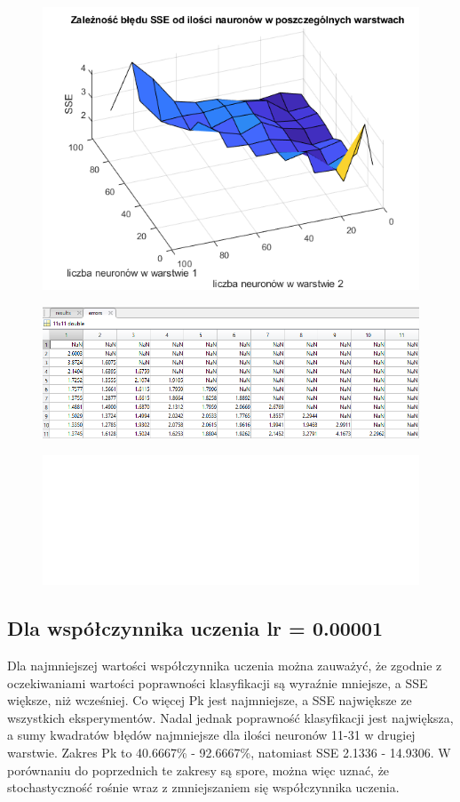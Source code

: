 \documentclass[a4paper, 12pt]{report}
\begin{document}
\begin{figure}[hbt!]
\includegraphics[width=14cm]{lr4 sse}
\centering
\end{figure}

\begin{figure}[hbt!]
\includegraphics[width=14cm]{lr4 sse dane}
\centering
\end{figure}

\begin{figure}[hbt!]
\includegraphics[width=22cm]{puste}
\centering
\end{figure}
  

\newpage
\subsection{Dla współczynnika uczenia lr = 0.00001}
Dla najmniejszej wartości  współczynnika uczenia można zauważyć, że  zgodnie z oczekiwaniami wartości poprawności klasyfikacji są wyraźnie mniejsze, a SSE większe, niż wcześniej. Co więcej Pk jest najmniejsze, a SSE największe ze wszystkich eksperymentów. Nadal jednak poprawność klasyfikacji jest największa, a sumy kwadratów błędów najmniejsze dla ilości neuronów 11-31 w drugiej warstwie.
Zakres Pk to 40.6667\% - 92.6667\%, natomiast SSE 2.1336 - 14.9306. W porównaniu do poprzednich te zakresy są spore, można więc uznać, że stochastyczność rośnie wraz z zmniejszaniem się współczynnika uczenia.
\end{document}

